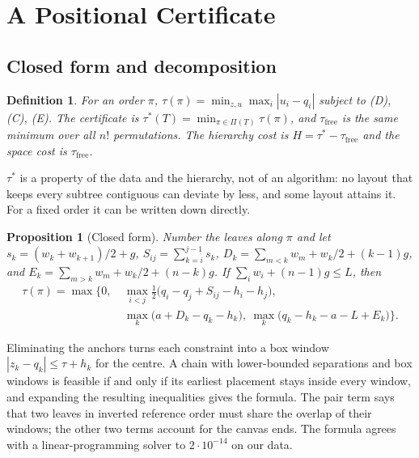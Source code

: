\documentclass[review]{vgtc}                 %
\newtheorem{proposition}[theorem]{Proposition}
\newtheorem{definition}[theorem]{Definition}
\newcommand{\free}{\mathrm{free}}
\begin{document}
\section{A Positional Certificate}\label{sec:cert}

\subsection{Closed form and decomposition}

\begin{definition}
For an order $\pi$, $\tau(\pi)=\min_{z,u}\max_i|u_i-q_i|$ subject to (D), (C), (E). The \emph{certificate} is $\tau^*(T)=\min_{\pi\in\Pi(T)}\tau(\pi)$, and $\tau_\free$ is the same minimum over all $n!$ permutations. The \emph{hierarchy cost} is $H=\tau^*-\tau_\free$ and the \emph{space cost} is $\tau_\free$.
\end{definition}

$\tau^*$ is a property of the data and the hierarchy, not of an algorithm: no layout that keeps every subtree contiguous can deviate by less, and some layout attains it. For a fixed order it can be written down directly.

\begin{proposition}[Closed form]\label{prop:closed}
Number the leaves along $\pi$ and let $s_k=(w_k+w_{k+1})/2+g$, $S_{ij}=\sum_{k=i}^{j-1}s_k$, $D_k=\sum_{m<k}w_m+w_k/2+(k-1)g$, and $E_k=\sum_{m>k}w_m+w_k/2+(n-k)g$. If $\sum_iw_i+(n-1)g\le L$, then
\begin{align*}
\tau(\pi)=\max\Big\{0,\ &\max_{i<j}\tfrac12\big(q_i-q_j+S_{ij}-h_i-h_j\big),\\
&\max_k\big(a+D_k-q_k-h_k\big),\ \max_k\big(q_k-h_k-a-L+E_k\big)\Big\}.
\end{align*}
\end{proposition}
Eliminating the anchors turns each constraint into a box window $|z_k-q_k|\le\tau+h_k$ for the centre. A chain with lower-bounded separations and box windows is feasible if and only if its earliest placement stays inside every window, and expanding the resulting inequalities gives the formula. The pair term says that two leaves in inverted reference order must share the overlap of their windows; the other two terms account for the canvas ends. The formula agrees with a linear-programming solver to $2\cdot10^{-14}$ on our data.
\end{document}
